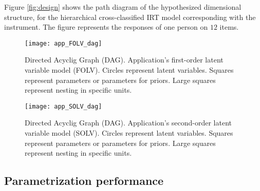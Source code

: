 Figure \ref{fig:design} shows the path diagram of the hypothesized dimensional structure, for the hierarchical cross-classified IRT model corresponding with the instrument. The figure represents the responses of one person on $12$ items.
%
\begin{figure}[H]
	\centering
	\texttt{[image: app\_FOLV\_dag]}
	\caption[Directed Acyclic Graph (DAG). Application's first-order latent variable model (FOLV).]%
	{Directed Acyclig Graph (DAG). Application's first-order latent variable model (FOLV). Circles represent latent variables. Squares represent parameters or parameters for priors. Large squares represent nesting in specific units.}
	\label{fig:FOLV_app}
\end{figure}
%
\begin{figure}[H]
	\centering
	\texttt{[image: app\_SOLV\_dag]}
	\caption[Directed Acyclic Graph (DAG). Application's second-order latent variable model (SOLV).]%
	{Directed Acyclig Graph (DAG). Application's second-order latent variable model (SOLV). Circles represent latent variables. Squares represent parameters or parameters for priors. Large squares represent nesting in specific units.}
	\label{fig:SOLV_app}
\end{figure}


\subsection{Parametrization performance}

